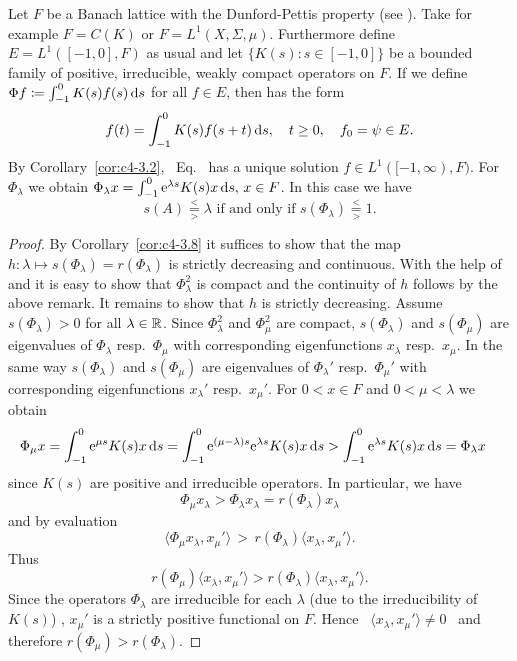 \begin{example}\label{ex:c4-3.10}
%
Let $F$ be a Banach lattice with the Dunford-Pettis property (see \textcite[Section II.9]{schaefer:1974}).
Take for example $F = C(K)$ or $F = L^{1}(X, \Sigma, \mu)$.
Furthermore define $E = L^{1}([-1,0],F)$ as usual and let $\{K(s) \colon s \in [-1,0]\}$ be a bounded family of positive, irreducible, weakly compact operators on $F$.
If we define $\Phi f \coloneqq \int_{-1}^{0} K(s)f(s) \mathop{}\!\mathrm{d}{s}$ for all $f \in E$, then 
has the form
\begin{equation}\label{eq:c4-3.11}
f(t) = \int_{-1}^{0} K(s)f(s+t) \ds  , \quad t \geq 0  ,\quad f_{0} = \psi \in E .
\end{equation}
By Corollary~\ref{cor:c4-3.2}, \ Eq.~ has a unique solution $f \in L^{1}([-1,\infty),F)$.
For $\Phi_{\lambda}$ we obtain $\Phi_{\lambda}x = \int_{-1}^{0} \mathrm{e}^{\lambda s}K(s)x \mathop{}\!\mathrm{d}{s},\, x \in F$.
In this case we have 
\[
\text{$s(A) \overset{<}{ \underset{>}{=} } \lambda$  if and only if 
$s(\Phi_{\lambda}) \overset{<}{ \underset{>}{=} } 1$.}
\]
\end{example}
\begin{proof}
By Corollary~\ref{cor:c4-3.8} it suffices to show that the map $h \colon \lambda \mapsto s(\Phi_{\lambda}) = r(\Phi_{\lambda})$ is strictly decreasing and continuous.
With the help of \textcite[Theorem III.11.4]{schaefer:1966} and \textcite[Theorem II.9.9]{schaefer:1974} it is easy to show that $\Phi_{\lambda}^{2}$ is compact and the continuity of\/ $h$ follows by the above remark.
It remains to show that $h$ is strictly decreasing.
Assume $s(\Phi_{\lambda}) > 0$ for all $\lambda \in \mathbb{R}$.
Since $\Phi_{\lambda}^{2}$ and $\Phi_{\mu}^{2}$ are compact, 
$s(\Phi_{\lambda})$ and $s(\Phi_{\mu})$ are eigenvalues of\/ $\Phi_{\lambda}$ resp.\ $\Phi_{\mu}$ with corresponding eigenfunctions $x_{\lambda}$ resp.\ $x_{\mu}$.
In the same way $s(\Phi_{\lambda})$ and $s(\Phi_{\mu})$ are eigenvalues of\/ $\Phi_{\lambda}'$ resp.\ $\Phi_{\mu}'$ with corresponding eigenfunctions $x_{\lambda}'$ resp.\ $x_{\mu}'$.
For $0 < x \in F$ and $0 < \mu < \lambda$ we obtain
\begin{align*}
\Phi_{\mu}x &= \int_{-1}^{0} \mathrm{e}^{\mu s}K(s)x \mathop{}\!\mathrm{d}{s} = \int_{-1}^{0} \mathrm{e}^{(\mu-\lambda) s}\mathrm{e}^{\lambda s}K(s)x \mathop{}\!\mathrm{d}{s} > \int_{-1}^{0} \mathrm{e}^{\lambda s}K(s)x \mathop{}\!\mathrm{d}{s} = \Phi_{\lambda}x
\end{align*}
since $K(s)$ are positive and irreducible operators.
In particular, we have 
%
\[
	\Phi_{\mu}x_{\lambda} > \Phi_{\lambda}x_{\lambda} = r(\Phi_{\lambda})x_{\lambda}
\]
%
and by evaluation %
\[
	\langle\Phi_{\mu}x_{\lambda},x_{\mu}'\rangle \,>\, r(\Phi_{\lambda})\langle x_{\lambda},x_{\mu}'\rangle .
\]
%
Thus %
\[
	r(\Phi_{\mu})\langle x_{\lambda},x_{\mu}'\rangle > r(\Phi_{\lambda})\langle x_{\lambda},x_{\mu}'\rangle .
\]
%
Since the operators $\Phi_{\lambda}$ are irreducible for each $\lambda$ (due to the irreducibility of\/ $K(s)$) , $x_{\mu}'$ is a strictly positive functional on $F$.
Hence \ $\langle x_{\lambda},x_{\mu}'\rangle \neq 0$ \ and therefore
$r(\Phi_{\mu}) > r(\Phi_{\lambda})$.
\end{proof}
